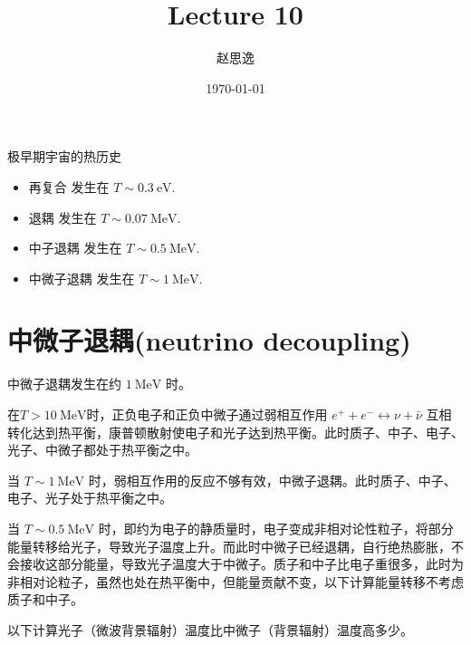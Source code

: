 \documentclass[12pt]{ctexart}
\title{Lecture 10}
\author{赵思逸}
\date{\today}
\begin{document}
\maketitle
极早期宇宙的热历史
\begin{itemize}
    \item 再复合 发生在 $T \sim 0.3 \mathrm{~eV}$.
    \item {} 退耦 发生在 $T \sim 0.07 \mathrm{~MeV}$.
    \item 中子退耦 发生在 $T \sim 0.5 \mathrm{~MeV}$.
    \item 中微子退耦 发生在 $T \sim 1 \mathrm{~MeV}$.
\end{itemize}

\section{中微子退耦(neutrino decoupling)}

中微子退耦发生在约 $1 \mathrm{~MeV}$ 时。

在$T> 10 \mathrm{~MeV}$时，正负电子和正负中微子通过弱相互作用 $e^+ + e^- \leftrightarrow \nu + \bar{\nu}$ 互相转化达到热平衡，康普顿散射使电子和光子达到热平衡。此时质子、中子、电子、光子、中微子都处于热平衡之中。

当 $T \sim 1 \mathrm{~MeV}$ 时，弱相互作用的反应不够有效，中微子退耦。此时质子、中子、电子、光子处于热平衡之中。

当 $T \sim 0.5 \mathrm{~MeV}$ 时，即约为电子的静质量时，电子变成非相对论性粒子，将部分能量转移给光子，导致光子温度上升。而此时中微子已经退耦，自行绝热膨胀，不会接收这部分能量，导致光子温度大于中微子。质子和中子比电子重很多，此时为非相对论粒子，虽然也处在热平衡中，但能量贡献不变，以下计算能量转移不考虑质子和中子。

以下计算光子（微波背景辐射）温度比中微子（背景辐射）温度高多少。
\end{document}
